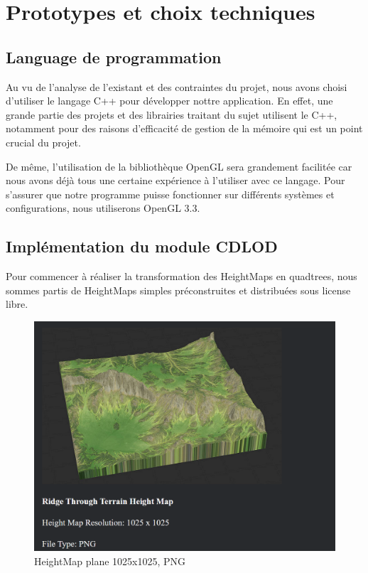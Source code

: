 \documentclass[12pt]{report}
\begin{document}
\newpage

\chapter{Prototypes et choix techniques}

\section{Language de programmation}

Au vu de l'analyse de l'existant et des contraintes du projet, nous avons choisi d'utiliser le langage C++ pour développer nottre application. En effet, une grande partie des projets et des librairies traitant du sujet utilisent le C++, notamment pour des raisons d'efficacité de gestion de la mémoire qui est un point crucial du projet.

De même, l'utilisation de la bibliothèque OpenGL sera grandement facilitée car nous avons déjà tous une certaine expérience à l'utiliser avec ce langage. Pour s'assurer que notre programme puisse fonctionner sur différents systèmes et configurations, nous utiliserons OpenGL 3.3.

\section{Implémentation du module CDLOD}

Pour commencer à réaliser la transformation des HeightMaps en quadtrees, nous sommes partis de HeightMaps simples préconstruites et distribuées sous license libre.

\begin{figure}[h]
    \centering
    \includegraphics[scale = 0.7]{images/simple_HeightMap_1025.PNG}
    \caption{HeightMap plane 1025x1025, PNG}
\end{figure}
\end{document}
